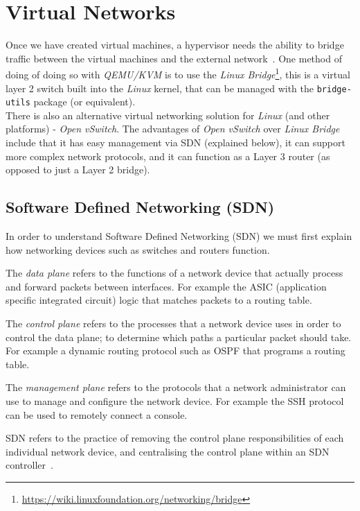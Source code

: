 \documentclass[
    author={Jacob Daniel Halsey},
    supervisor={Prof. Awais Rashid},
    degree={BSc},
    title={Building a Testbed for Evaluating Privacy Enhancing Technologies  (PETs)},
    subtitle={},
    type={software development},
    year={2021}
]{dissertation}
\begin{document}
\section{Virtual Networks}

Once we have created virtual machines, a hypervisor needs the ability to bridge traffic between
the virtual machines and the external network~\cite{openvswitch_why}. 
One method of doing of doing so with \emph{QEMU/KVM} is to use the 
\emph{Linux Bridge}\footnote{\url{https://wiki.linuxfoundation.org/networking/bridge}},
this is a virtual layer 2 switch built into the \emph{Linux} kernel, that can be
managed with the \texttt{bridge-utils} package (or equivalent). \\

There is also an alternative virtual networking solution for \emph{Linux} (and other platforms)
- \emph{Open vSwitch}. The advantages of \emph{Open vSwitch} over \emph{Linux Bridge} include that it has
easy management via SDN (explained below), it can support more complex network protocols, and it can
function as a Layer 3 router (as opposed to just a Layer 2 bridge).

\subsection{Software Defined Networking (SDN)}

In order to understand Software Defined Networking (SDN) we must first explain how networking
devices such as switches and routers function. 

The \emph{data plane} refers to the functions of a network device that actually process and forward
packets between interfaces. For example the ASIC (application specific integrated circuit) logic
that matches packets to a routing table.

The \emph{control plane} refers to the processes that a network device uses in order to control
the data plane; to determine which paths a particular packet should take. For example a
dynamic routing protocol such as OSPF that programs a routing table.

The \emph{management plane} refers to the protocols that a network administrator can
use to manage and configure the network device. For example the SSH protocol can be used
to remotely connect a console.

SDN refers to the practice of removing the control plane responsibilities of each individual
network device, and centralising the control plane within an 
SDN controller~\cite[760]{odom_2016_ccna}.\\
\end{document}
